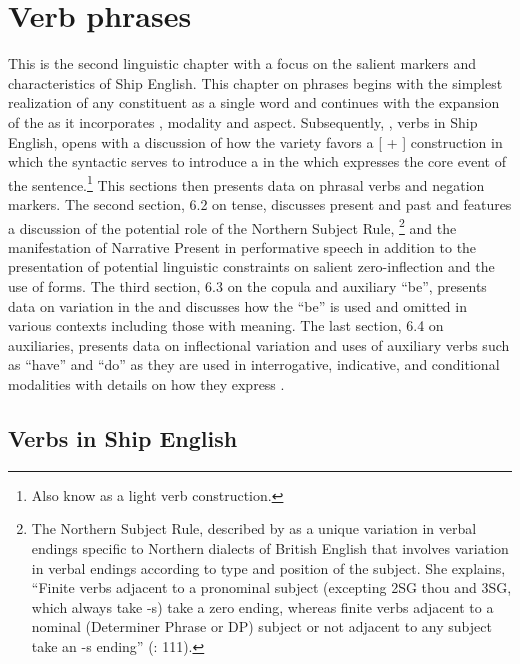 \chapter{{Verb phrases}}

This is the second linguistic chapter with a focus on the salient markers and characteristics of Ship English. This chapter on  phrases begins with the simplest realization of any  constituent as a single word and continues with the expansion of the  as it incorporates , modality and aspect. Subsequently, , verbs in Ship English, opens with a discussion of how the variety favors a [ + ] construction in which the syntactic  serves to introduce a  in the  which expresses the core event of the sentence.\footnote{Also know as a light verb construction.}  This sections then presents data on phrasal verbs and negation markers. The second section, 6.2 on tense, discusses present and past  and features a discussion of the potential role of the Northern Subject Rule, \footnote{The Northern Subject Rule, described by  \citet{deHaas2008} as a unique variation in verbal endings specific to Northern dialects of British English that involves variation in verbal endings according to type and position of the subject.  She explains, “Finite verbs adjacent to a pronominal subject (excepting 2SG thou and 3SG, which always take -s) take a zero ending, whereas finite verbs adjacent to a nominal (Determiner Phrase or DP) subject or not adjacent to any subject take an -s ending” (\citealt{deHaas2008}: 111).} and the manifestation of Narrative Present in performative speech in addition to the presentation of potential linguistic constraints on salient zero-inflection and the use of  forms. The third section, 6.3 on the copula and auxiliary “be”, presents data on variation in the  and discusses how the  “be” is used and omitted in various contexts including those with  meaning. The last section, 6.4 on auxiliaries, presents data on inflectional variation and uses of auxiliary verbs such as “have” and “do” as they are used in interrogative, indicative, and conditional modalities with details on how they express . 

\section{{Verbs in Ship English}}\label{sec:6.1}

